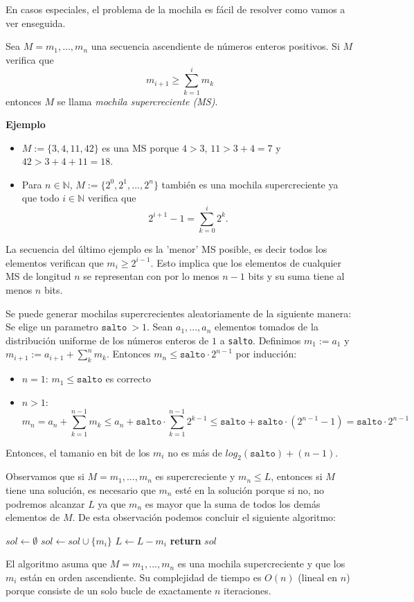 \documentclass[12pt]{article}
\newcommand{\N}{\mathbb{N}}
\newenvironment{definition}[2][Definición]{\begin{trivlist}
\item[\hskip \labelsep {\bfseries #1}]}{\end{trivlist}}
\begin{document}
En casos especiales, el problema de la mochila es fácil de resolver como vamos a ver enseguida.

\begin{definition}{1}
Sea $M = m_1, ..., m_n$ una secuencia ascendiente de números enteros positivos. Si $M$ verifica que
$$m_{i+1} \geq \sum_{k=1}^im_k$$
entonces $M$ se llama \emph{mochila supercreciente (MS)}.
\end{definition}
\textbf{Ejemplo}
\begin{itemize}
\item
$M := \{3, 4, 11, 42\}$ es una MS porque $4 > 3$, $11 > 3 + 4 = 7$ y $42 > 3 + 4 + 11 = 18$.

\item 
Para $n \in \N$, $M := \{2^0, 2^1, ..., 2^n\}$ también es una mochila supercreciente ya que todo $i \in \N$ verifica que
$$2^{i+1} - 1 = \sum_{k=0}^i2^k.$$
\end{itemize}
La secuencia del último ejemplo es la 'menor' MS posible, es decir todos los elementos verifican que $m_i \geq 2^{i-1}$. Esto implica que los elementos de cualquier MS de longitud $n$ se representan con por lo menos $n-1$ bits y su suma tiene al menos $n$ bits.

Se puede generar mochilas supercrecientes aleatoriamente de la siguiente manera: Se elige un parametro $\texttt{salto}\ > 1$. Sean $a_1, ..., a_n$ elementos tomados de la distribución uniforme de los números enteros de $1$ a \texttt{salto}. Definimos $m_1 := a_1$ y $m_{i+1} := a_{i+1} + \sum_k^n m_{k}$. Entonces $m_n \leq \texttt{salto} \cdot 2^{n-1}$ por inducción:
\begin{itemize}
	\item $n = 1$: $m_1 \leq \texttt{salto}$ es correcto
	\item $n > 1$:
	$$m_{n} = a_n + \sum_{k=1}^{n-1} m_{k} \leq a_n + \texttt{salto} \cdot \sum_{k=1}^{n-1}2^{k-1} \leq \texttt{salto} + \texttt{salto} \cdot ( 2^{n-1} - 1) = \texttt{salto} \cdot 2^{n-1}$$
\end{itemize}
Entonces, el tamanio en bit de los $m_i$ no es más de $log_2(\texttt{salto}) + (n-1)$.

Observamos que si $M = m_1, ..., m_n$ es supercreciente y $m_n \leq L$, entonces si $M$ tiene una solución, es necesario que $m_n$ esté en la solución porque si no, no podremos alcanzar $L$ ya que $m_n$ es mayor que la suma de todos los demás elementos de $M$.
De esta observación podemos concluir el siguiente algoritmo:
\vspace{1em}
\begin{algorithmic}[1]
\State $sol \gets \emptyset$
		\State $sol \gets sol \cup \{m_i\}$
		\State $L \gets L - m_i$
	\EndIf
\EndFor
\State \textbf{return} $sol$
\EndProcedure
\end{algorithmic}
\vspace{1em}
El algoritmo asuma que $M = m_1,...,m_n$ es una mochila supercreciente y que los $m_i$ están en orden ascendiente. Su complejidad de tiempo es $O(n)$ (lineal en $n$) porque consiste de un solo bucle de exactamente $n$ iteraciones.
\end{document}
